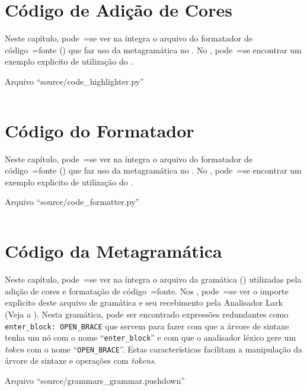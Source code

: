\chapter{Código de Adição de Cores}

Neste capítulo,
pode~=se ver na íntegra o arquivo do formatador de código~=fonte () que faz uso da metagramática no .
No ,
pode~=se encontrar um exemplo explicito de utilização do .
\begin{code}
\caption{Arquivo ``source/code\_highlighter.py''}
\label{codeHighlighterPy}
\inputminted{python3}{../source/code_highlighter.py}
\end{code}


\chapter{Código do Formatador}

Neste capítulo,
pode~=se ver na íntegra o arquivo do formatador de código~=fonte () que faz uso da metagramática no .
No ,
pode~=se encontrar um exemplo explicito de utilização do .
\begin{code}
\caption{Arquivo ``source/code\_formatter.py''}
\label{codeFormatterPy}
\inputminted{python3}{../source/code_formatter.py}
\end{code}


\chapter{Código da Metagramática}

Neste capítulo,
pode~=se ver na íntegra o arquivo da gramática () utilizadas pela adição de cores e
formatação de código~=fonte.
Nos ,
pode~=se ver o importe explicito deste arquivo de gramática e
seu recebimento pela Analisador Lark (Veja a ).
Nesta gramática,
pode ser encontrado expressões redundantes como \texttt{enter_block:
OPEN_BRACE} que servem para fazer com que a árvore de sintaxe tenha um nó com o nome ``\texttt{enter_block}'' e
com que o analisador léxico gere um \textit{token} com o nome ``\texttt{OPEN_BRACE}''.
Estas características facilitam a manipulação da árvore de sintaxe e
operações com \textit{tokens}.
\begin{code}
\caption{Arquivo ``source/grammars\_grammar.pushdown''}
\label{grammarsGrammarPushdown}
\inputminted{antlr}{../source/grammars_grammar.pushdown}
\end{code}
